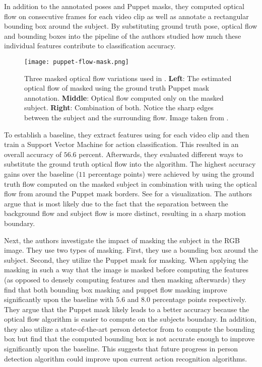 In addition to the annotated poses and Puppet masks, they computed optical flow on consecutive frames for each video clip as well as annotate a rectangular bounding box around the subject.
By substituting ground truth pose, optical flow and bounding boxes into the pipeline of \cite{wang_dense_2013} the authors studied how much these individual features contribute to classification accuracy.

\begin{figure}[htb!]
    \centering
    \texttt{[image: puppet-flow-mask.png]}
    \caption{Three masked optical flow variations used in \cite{jhuang_towards_2013}. \textbf{Left}: The estimated optical flow of \cite{wang_dense_2013} masked using the ground truth Puppet mask annotation. \textbf{Middle}: Optical flow computed only on the masked subject. \textbf{Right}: Combination of both. Notice the sharp edges between the subject and the surrounding flow. Image taken from \cite{jhuang_towards_2013}. }
    \label{fig:puppet-flow-mask}
\end{figure}

To establish a baseline, they extract features using \cite{wang_dense_2013} for each video clip and then train a Support Vector Machine for action classification.
This resulted in an overall accuracy of $56.6$ percent.
Afterwards, they evaluated different ways to substitute the ground truth optical flow into the algorithm.
The highest accuracy gains over the baseline ($11$ percentage points) were achieved by using the ground truth flow computed on the masked subject in combination with using the optical flow from around the Puppet mask borders.
See  for a visualization.
The authors argue that is most likely due to the fact that the separation between the background flow and subject flow is more distinct, resulting in a sharp motion boundary. 

Next, the authors investigate the impact of masking the subject in the RGB image. 
They use two types of masking. First, they use a bounding box around the subject. Second, they utilize the Puppet mask for masking. 
When applying the masking in such a way that the image is masked before computing the features (as opposed to densely computing features and then masking afterwards) they find that both bounding box masking and puppet flow masking improve significantly upon the baseline with $5.6$ and $8.0$ percentage points respectively.
They argue that the Puppet mask likely leads to a better accuracy because the optical flow algorithm is easier to compute on the subjects boundary.
In addition, they also utilize a state-of-the-art person detector from \cite{bourdev_detecting_2010} to compute the bounding box but find that the computed bounding box is not accurate enough to improve significantly upon the baseline.
This suggests that future progress in person detection algorithm could improve upon current action recognition algorithms.

